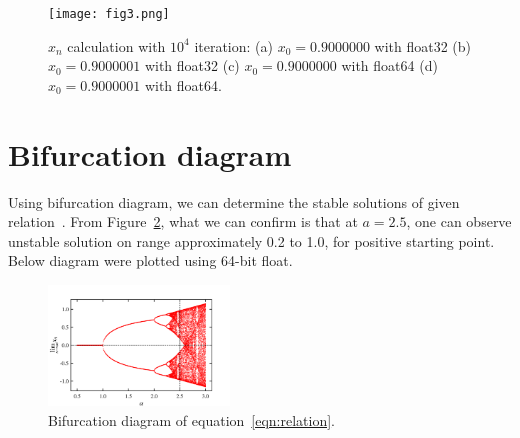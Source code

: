 \documentclass[reprint, nofootinbib]{revtex4-2} %
\begin{document}
\appendix
\begin{figure}[H]
	\texttt{[image: fig3.png]}
	\caption{$x_n$ calculation with $10^4$ iteration: (a) $x_0=0.9000000$ with float32 (b) $x_0=0.9000001$ with float32 (c) $x_0=0.9000000$ with float64 (d) $x_0=0.9000001$ with float64. }
	\label{fig:fig3}
\end{figure}
\section{Bifurcation diagram}\label{sec:appA}
Using bifurcation diagram, we can determine the stable solutions of given relation~\cite{Bdiagram}. From Figure~\ref{fig:bifurcation}, what we can confirm is that at $a=2.5$, one can observe unstable solution on range approximately 0.2 to 1.0, for positive starting point. Below diagram were plotted using 64-bit float.

\begin{figure}[b]
	\includegraphics[width=0.43\textwidth]{bifurcation.png}
	\caption{Bifurcation diagram of equation~\eqref{eqn:relation}.}
	\label{fig:bifurcation}
\end{figure}





\end{document}
